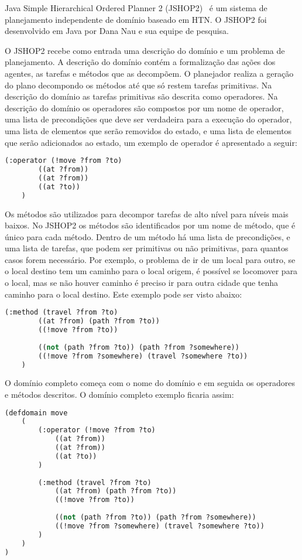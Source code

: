 Java Simple Hierarchical Ordered Planner 2 (JSHOP2)~\cite{ilghami2006documentation} é um sistema de planejamento independente de domínio baseado em HTN. O JSHOP2 foi desenvolvido em Java por Dana Nau e sua equipe de pesquisa. 

O JSHOP2 recebe como entrada uma descrição do domínio e um problema de planejamento. 
A descrição do domínio contém a formalização das ações dos agentes, as tarefas e métodos que as decompõem.
O planejador realiza a geração do plano decompondo os métodos até que só restem tarefas primitivas. Na descrição do domínio as tarefas primitivas são descrita como operadores. Na descrição do domínio os operadores são compostos por um nome de operador, uma lista de precondições que deve ser verdadeira para a execução do operador, uma lista de elementos que serão removidos do estado, e uma lista de elementos que serão adicionados ao estado, um exemplo de operador é apresentado a seguir:

\lstset{style=codeStyle}
\begin{lstlisting}[language=lisp]
	(:operator (!move ?from ?to) 
		((at ?from)) 
		((at ?from))
		((at ?to))
	)
\end{lstlisting}

Os métodos são utilizados para decompor tarefas de alto nível para níveis mais baixos. No JSHOP2 os métodos são identificados por um nome de método, que é único para cada método. Dentro de um método há uma lista de precondições, e uma lista de tarefas, que podem ser primitivas ou não primitivas, para quantos casos forem necessário. Por exemplo, o problema de ir de um local para outro, se o local destino tem um caminho para o local origem, é possível se locomover para o local, mas se não houver caminho é preciso ir para outra cidade que tenha caminho para o local destino. Este exemplo pode ser visto abaixo:

\lstset{style=codeStyle}
\begin{lstlisting}[language=lisp]
	(:method (travel ?from ?to)
		((at ?from) (path ?from ?to))
		((!move ?from ?to))
		
		((not (path ?from ?to)) (path ?from ?somewhere))
		((!move ?from ?somewhere) (travel ?somewhere ?to))
	)
\end{lstlisting}

O domínio completo começa com o nome do domínio e em seguida os operadores e métodos descritos. O domínio completo exemplo ficaria assim: 

\lstset{style=codeStyle}
\begin{lstlisting}[language=lisp]
(defdomain move
	(
		(:operator (!move ?from ?to) 
			((at ?from)) 
			((at ?from))
			((at ?to))
		)
	
		(:method (travel ?from ?to)
			((at ?from) (path ?from ?to))
			((!move ?from ?to))
		
			((not (path ?from ?to)) (path ?from ?somewhere))
			((!move ?from ?somewhere) (travel ?somewhere ?to))
		)    
	)
)
\end{lstlisting}

